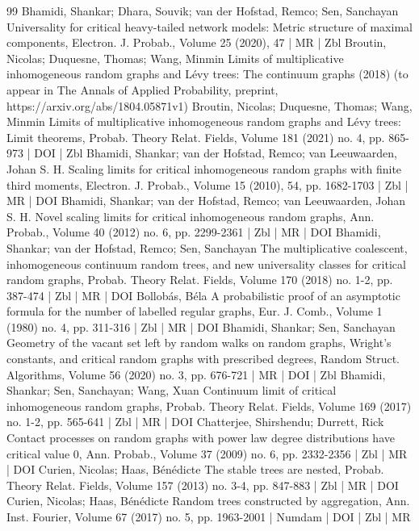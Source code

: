 \documentclass[10pt]{amsart}
\theoremstyle{definition}\newtheorem{defi}[theo]{Definition}\newtheorem{rema}[theo]{Remark}\newtheorem{exam}[theo]{Example}\newtheorem{exem}[theo]{Example}\newtheorem{nota}[theo]{Notation}
\begin{document}
\begin{thebibliography}{99}
Bhamidi, Shankar; Dhara, Souvik; van der Hofstad, Remco; Sen, Sanchayan Universality for critical heavy-tailed network models: Metric structure of maximal components, Electron. J. Probab., Volume 25 (2020), 47 | MR | Zbl
Broutin, Nicolas; Duquesne, Thomas; Wang, Minmin Limits of multiplicative inhomogeneous random graphs and Lévy trees: The continuum graphs (2018) (to appear in The Annals of Applied Probability, preprint, https://arxiv.org/abs/1804.05871v1)
Broutin, Nicolas; Duquesne, Thomas; Wang, Minmin Limits of multiplicative inhomogeneous random graphs and Lévy trees: Limit theorems, Probab. Theory Relat. Fields, Volume 181 (2021) no. 4, pp. 865-973 | DOI | Zbl
Bhamidi, Shankar; van der Hofstad, Remco; van Leeuwaarden, Johan S. H. Scaling limits for critical inhomogeneous random graphs with finite third moments, Electron. J. Probab., Volume 15 (2010), 54, pp. 1682-1703 | Zbl | MR | DOI
Bhamidi, Shankar; van der Hofstad, Remco; van Leeuwaarden, Johan S. H. Novel scaling limits for critical inhomogeneous random graphs, Ann. Probab., Volume 40 (2012) no. 6, pp. 2299-2361 | Zbl | MR | DOI
Bhamidi, Shankar; van der Hofstad, Remco; Sen, Sanchayan The multiplicative coalescent, inhomogeneous continuum random trees, and new universality classes for critical random graphs, Probab. Theory Relat. Fields, Volume 170 (2018) no. 1-2, pp. 387-474 | Zbl | MR | DOI
Bollobás, Béla A probabilistic proof of an asymptotic formula for the number of labelled regular graphs, Eur. J. Comb., Volume 1 (1980) no. 4, pp. 311-316 | Zbl | MR | DOI
Bhamidi, Shankar; Sen, Sanchayan Geometry of the vacant set left by random walks on random graphs, Wright’s constants, and critical random graphs with prescribed degrees, Random Struct. Algorithms, Volume 56 (2020) no. 3, pp. 676-721 | MR | DOI | Zbl
Bhamidi, Shankar; Sen, Sanchayan; Wang, Xuan Continuum limit of critical inhomogeneous random graphs, Probab. Theory Relat. Fields, Volume 169 (2017) no. 1-2, pp. 565-641 | Zbl | MR | DOI
Chatterjee, Shirshendu; Durrett, Rick Contact processes on random graphs with power law degree distributions have critical value 0, Ann. Probab., Volume 37 (2009) no. 6, pp. 2332-2356 | Zbl | MR | DOI
Curien, Nicolas; Haas, Bénédicte The stable trees are nested, Probab. Theory Relat. Fields, Volume 157 (2013) no. 3-4, pp. 847-883 | Zbl | MR | DOI
Curien, Nicolas; Haas, Bénédicte Random trees constructed by aggregation, Ann. Inst. Fourier, Volume 67 (2017) no. 5, pp. 1963-2001 | Numdam | DOI | Zbl | MR

\end{thebibliography}
\end{document}
